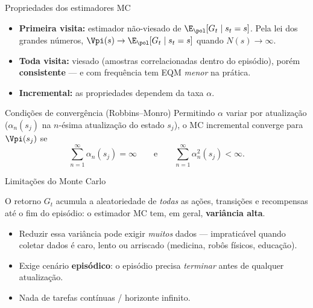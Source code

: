 \documentclass[aspectratio=169, 11pt]{beamer}
\begin{document}
\begin{frame}{Propriedades dos estimadores MC}
  \begin{itemize}
    \item \textbf{Primeira visita:} estimador \alert{não-viesado} de
      $\E_{\pol}[G_t \mid s_t = s]$. Pela lei dos grandes números,
      $\Vpi(s) \to \E_{\pol}[G_t \mid s_t = s]$ quando $N(s) \to \infty$.
    \item \textbf{Toda visita:} \alert{viesado} (amostras correlacionadas
      dentro do episódio), porém \textbf{consistente} — e com frequência
      tem EQM \emph{menor} na prática.
    \item \textbf{Incremental:} as propriedades dependem da taxa $\alpha$.
  \end{itemize}

  \begin{teobox}{Condições de convergência (Robbins–Monro)}
    Permitindo $\alpha$ variar por atualização
    ($\alpha_n(s_j)$ na $n$-ésima atualização do estado $s_j$),
    o MC incremental converge para $\Vpi(s_j)$ se
    \[
      \sum_{n=1}^{\infty} \alpha_n(s_j) = \infty
      \qquad \text{e} \qquad
      \sum_{n=1}^{\infty} \alpha_n^2(s_j) < \infty.
    \]
  \end{teobox}
\end{frame}

\begin{frame}{Limitações do Monte Carlo}
  \begin{alertabox}
    O retorno $G_t$ acumula a aleatoriedade de \emph{todas} as ações,
    transições e recompensas até o fim do episódio: o estimador MC tem,
    em geral, \textbf{variância alta}.
  \end{alertabox}

  \begin{itemize}
    \item Reduzir essa variância pode exigir \emph{muitos} dados —
      impraticável quando coletar dados é caro, lento ou arriscado
      (medicina, robôs físicos, educação).
    \item Exige cenário \textbf{episódico}: o episódio precisa
      \emph{terminar} antes de qualquer atualização.
    \item Nada de tarefas contínuas / horizonte infinito.
  \end{itemize}
\end{frame}
\end{document}
